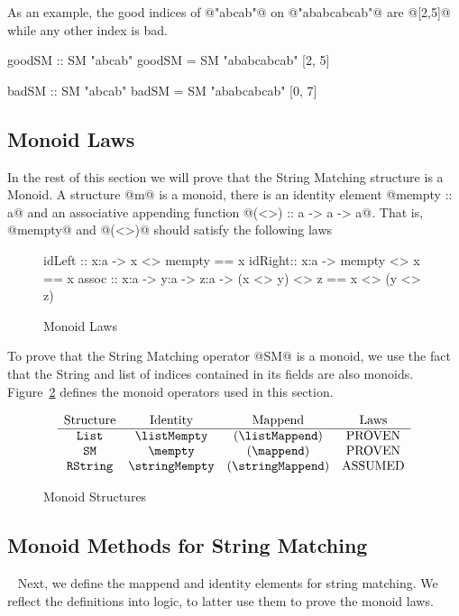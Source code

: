 As an example, the good indices of @"abcab"@ on @"ababcabcab"@
are @[2,5]@ while any other index is bad.
\begin{code}
goodSM :: SM "abcab"
goodSM = SM "ababcabcab" [2, 5]

badSM  :: SM "abcab"
badSM  = SM "ababcabcab" [0, 7]
\end{code}

\subsection{Monoid Laws}
In the rest of this section we will prove that
the String Matching structure is a Monoid.
%
A structure @m@ is a monoid,
there is an identity element @mempty :: a@
and an associative appending function @(<>) :: a -> a -> a@.
That is, @mempty@ and @(<>)@ should satisfy the following laws
\begin{figure}
\begin{code}
idLeft :: x:a -> {x <> mempty == x }
idRight:: x:a -> {mempty <> x == x }
assoc  :: x:a -> y:a -> z:a -> {(x <> y) <> z == x <> (y <> z)}
\end{code}
\caption{Monoid Laws}
\label{fig:monoid:laws}
\end{figure}
%
To prove that the String Matching operator @SM@
is a monoid, we use the fact that the String and list
of indices contained in its fields are also monoids.
%
Figure~\ref{fig:monoids} defines the monoid operators used
in this section.
%
\begin{figure}
$$
\begin{array}{c c c c }
\text{Structure} & \text{Identity} & \text{Mappend} & \text{Laws} \\
\hline
\texttt{List} & \listMempty & (\listMappend) & \text{PROVEN} \\
\texttt{SM} & \mempty & (\mappend) & \text{PROVEN} \\
\texttt{RString} & \stringMempty & (\stringMappend) & \text{ASSUMED}
\end{array}
$$
\caption{Monoid Structures}
\label{fig:monoids}
\end{figure}


\subsection{Monoid Methods for String Matching}~\label{subsec:monoid:methods}
Next, we define the mappend and identity elements for string matching.
We reflect the definitions into logic, to latter use them to prove
the monoid laws.

